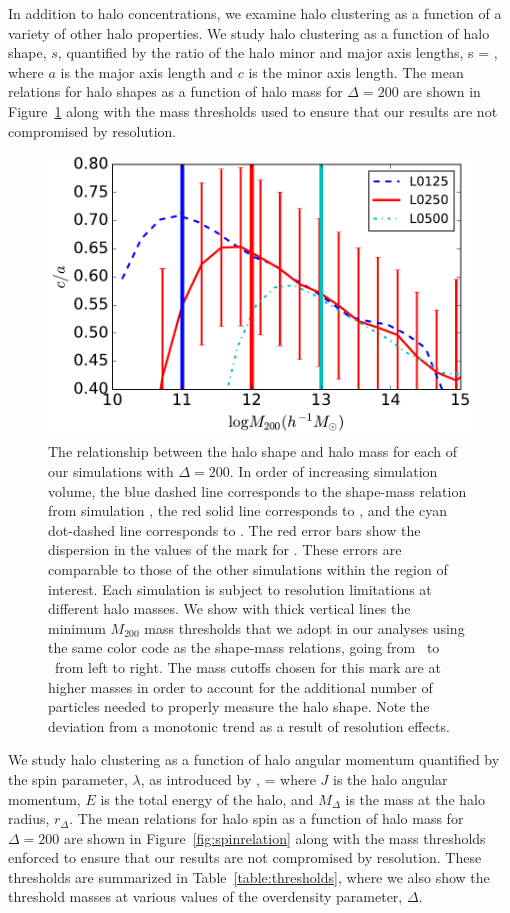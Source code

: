 \documentclass[usenatbib]{mnras}
\begin{document}
In addition to halo concentrations, we examine halo clustering as a function of a variety of other 
halo properties. We study halo clustering as a function of halo shape, $s$, 
quantified by the ratio of the halo minor and major axis lengths, 
%
\beq
s = ,
\eeq
%
where $a$ is the major axis length and $c$ is the minor axis length. 
The mean relations for halo shapes as a function of halo mass for $\Delta=200$ 
are shown in Figure~\ref{fig:srelation} along with the mass 
thresholds used to ensure that our results are not compromised by 
resolution.


\begin{figure}
\centering
\includegraphics[width=.5\textwidth]{masscut_shape_d200.pdf}
\caption{
The relationship between the halo shape and halo mass for each of our simulations with $\Delta =200$. 
In order of increasing simulation volume, the blue dashed line corresponds to the shape-mass relation from simulation 
\simA, the red solid line corresponds to \simB, and the cyan dot-dashed line corresponds to \simC. The red error bars show the
dispersion in the values of the mark for \simB. These errors are comparable to those of the other simulations
within the region of interest.
Each simulation is subject to resolution limitations at different halo masses. We show with thick vertical lines 
the minimum $M_{200}$ mass thresholds that we adopt in our analyses using the same color code as 
the shape-mass relations, going from \simA \ to \simC \ from left to right. The mass cutoffs chosen for this mark
are at higher masses in order to account for the additional number of particles needed to properly measure the
halo shape. Note the deviation from a monotonic trend as a result of resolution effects.
}
\label{fig:srelation}
\end{figure}

We study halo clustering as a function of halo angular momentum quantified 
by the spin parameter, $\lambda$, as introduced by \citep{peebles69},
\beq
\lambda = 
\eeq
where $J$ is the halo angular momentum, $E$ is the total energy of the 
halo, and $M_{\Delta}$ is the mass at the halo radius, $r_{\Delta}$. 
The mean relations for halo spin as a function of halo mass for $\Delta=200$ 
are shown in Figure~\ref{fig:spinrelation} along with the mass thresholds 
enforced to ensure that our results are not compromised by resolution. 
These thresholds are summarized in Table~\ref{table:thresholds}, where 
we also show the threshold masses at various values of the overdensity 
parameter, $\Delta$.
\end{document}
